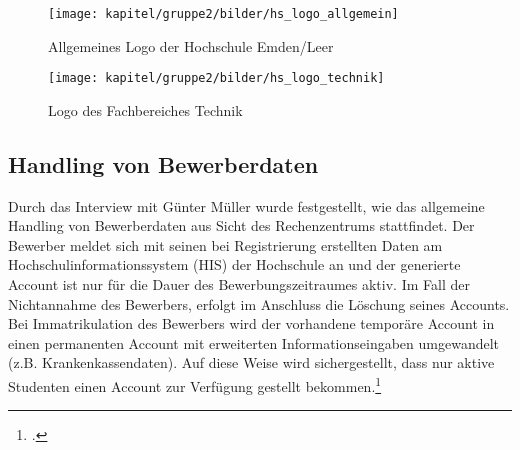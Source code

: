\begin{figure}[h!]
	\centering
	\texttt{[image: kapitel/gruppe2/bilder/hs\_logo\_allgemein]}
	\caption{Allgemeines Logo der Hochschule Emden/Leer\protect\footnotemark}
	\label{fig_logo_allgemein}
\end{figure}

\begin{figure}[h!]
	\centering
	\texttt{[image: kapitel/gruppe2/bilder/hs\_logo\_technik]}
	\caption{Logo des Fachbereiches Technik\protect\footnotemark}
	\label{fig_logo_fb_technik}
\end{figure}

\subsection{Handling von Bewerberdaten}
Durch das Interview mit Günter Müller wurde festgestellt, wie das allgemeine Handling von Bewerberdaten aus Sicht des Rechenzentrums stattfindet. 
Der Bewerber meldet sich mit seinen bei Registrierung erstellten Daten am Hochschulinformationssystem (HIS) der Hochschule an und der generierte Account ist nur für die Dauer des Bewerbungszeitraumes aktiv. Im Fall der Nichtannahme des Bewerbers, erfolgt im Anschluss die Löschung seines Accounts. Bei Immatrikulation des Bewerbers wird der vorhandene temporäre Account in einen permanenten Account mit erweiterten Informationseingaben umgewandelt (z.B. Krankenkassendaten). Auf diese Weise wird sichergestellt, dass nur aktive Studenten einen Account zur Verfügung gestellt bekommen.\footcite{gunter_muller_interview}